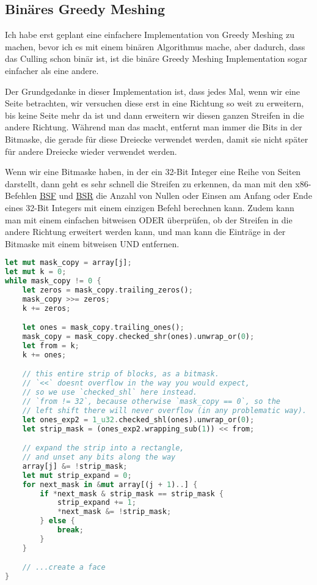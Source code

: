 \subsection{Binäres Greedy Meshing}

Ich habe erst geplant eine einfachere Implementation
von Greedy Meshing zu machen, bevor ich es mit
einem binären Algorithmus mache, aber dadurch,
dass das Culling schon binär ist, ist die binäre
Greedy Meshing Implementation sogar einfacher als
eine andere.

Der Grundgedanke in dieser Implementation ist,
dass jedes Mal, wenn wir eine Seite betrachten,
wir versuchen diese erst in eine Richtung so weit
zu erweitern, bis keine Seite mehr da ist und dann
erweitern wir diesen ganzen Streifen in die andere
Richtung.
Während man das macht, entfernt man immer die
Bits in der Bitmaske, die gerade für diese Dreiecke
verwendet werden, damit sie nicht später für andere
Dreiecke wieder verwendet werden.


Wenn wir eine Bitmaske haben, in der ein
32-Bit Integer eine Reihe von Seiten darstellt,
dann geht es sehr schnell die Streifen zu erkennen,
da man mit den x86-Befehlen
\href{https://www.felixcloutier.com/x86/bsf}{BSF} \cite{bsf}
und
\href{https://www.felixcloutier.com/x86/bsr}{BSR} \cite{bsr}
die Anzahl von Nullen oder Einsen am Anfang oder
Ende eines 32-Bit Integers mit einem einzigen
Befehl berechnen kann.
Zudem kann man mit einem einfachen bitweisen ODER
überprüfen, ob der Streifen in die andere Richtung
erweitert werden kann, und man kann die Einträge
in der Bitmaske mit einem bitweisen UND entfernen.

\begin{lstlisting}[language=Rust]
let mut mask_copy = array[j];
let mut k = 0;
while mask_copy != 0 {
	let zeros = mask_copy.trailing_zeros();
	mask_copy >>= zeros;
	k += zeros;

	let ones = mask_copy.trailing_ones();
	mask_copy = mask_copy.checked_shr(ones).unwrap_or(0);
	let from = k;
	k += ones;

	// this entire strip of blocks, as a bitmask.
	// `<<` doesnt overflow in the way you would expect,
	// so we use `checked_shl` here instead.
	// `from != 32`, because otherwise `mask_copy == 0`, so the
	// left shift there will never overflow (in any problematic way).
	let ones_exp2 = 1_u32.checked_shl(ones).unwrap_or(0);
	let strip_mask = (ones_exp2.wrapping_sub(1)) << from;

	// expand the strip into a rectangle,
	// and unset any bits along the way
	array[j] &= !strip_mask;
	let mut strip_expand = 0;
	for next_mask in &mut array[(j + 1)..] {
		if *next_mask & strip_mask == strip_mask {
			strip_expand += 1;
			*next_mask &= !strip_mask;
		} else {
			break;
		}
	}

	// ...create a face
}
\end{lstlisting}

